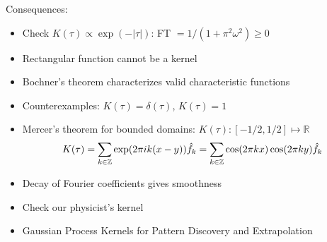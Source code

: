 \documentclass[twoside,11pt]{article}
\numberwithin{equation}{section}
\begin{document}
Consequences:
%
\begin{itemize}
    \item Check $K(\tau) \propto \exp(-|\tau|)$: FT $ = 1 / (1 + \pi^2 \omega^2) \ge 0$
    \item Rectangular function cannot be a kernel
    \item Bochner's theorem characterizes valid characteristic functions
    \item Counterexamples: $K(\tau) = \delta(\tau)$, $K(\tau) = 1$
    \item Mercer's theorem for bounded domains: $K(\tau): [-1/2,1/2] \mapsto \mathbb{R}$
    \begin{align*}
        K(\tau) = 
            \sum_{k \in \mathbb{Z}} \exp(2 \pi i k (x - y)) \hat{f}_k = 
            \sum_{k \in \mathbb{Z}} \cos(2 \pi k x) \cos(2 \pi k y) \hat{f}_k
    \end{align*}
    \item Decay of Fourier coefficients gives smoothness
    \item Check our physicist's kernel
    \item Gaussian Process Kernels for Pattern Discovery and Extrapolation
\end{itemize}
\end{document}
